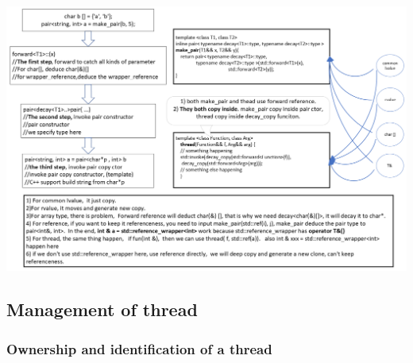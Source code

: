 \documentclass[a4paper,11pt,twoside]{book}
\begin{document}
\begin{itemize}
\begin{center}
    \includegraphics[width=0.85\linewidth]{pics/make_pair.png}
\end{center}

\end{itemize}


\subsection{Management of thread}
\subsubsection{Ownership and identification of a thread}
\end{document}
